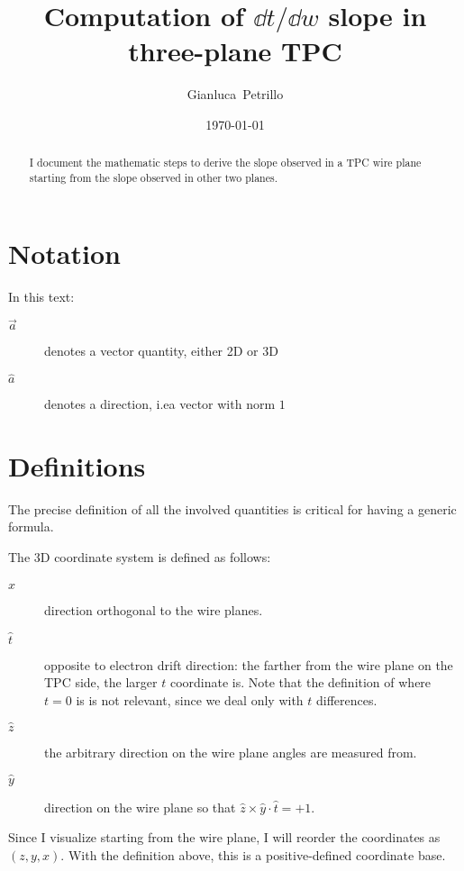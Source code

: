 \documentclass{article}
\title{Computation of $\dd t / \dd w$ slope in three-plane TPC}
\author{Gianluca~Petrillo}
\date{\today}
\DeclareRobustCommand{\brackets}[1]{\ensuremath{\left(#1\right)}}
\newcommand{\ie}{i.e\punct}
\begin{document}
	
	\maketitle
	
	\begin{abstract}
	I document the mathematic steps to derive the slope observed in a TPC wire plane
	starting from the slope observed in other two planes.
	\end{abstract}
	
	\section{Notation}
	\label{sec:Notation}
	
	In this text:
	\begin{description}
		\item[$\vec{a}$] denotes a vector quantity, either 2D or 3D
		\item[$\hat{a}$] denotes a direction, \ie a vector with norm $1$
	\end{description}
	
	\section{Definitions}
	\label{sec:Definitions}
	
	The precise definition of all the involved quantities is critical for having a generic formula.
	
	The 3D coordinate system is defined as follows:
	\begin{description}
		\item[$\hat{x}$] direction orthogonal to the wire planes.
		\item[$\hat{t}$] opposite to electron drift direction:
			the farther from the wire plane on the TPC side, the larger $t$ coordinate is.
			Note that the definition of where $t = 0$ is is not relevant, since we deal only with $t$ differences.
		\item[$\hat{z}$] the arbitrary direction on the wire plane angles are measured from.
		\item[$\hat{y}$] direction on the wire plane so that $\hat{z}\times\hat{y}\cdot\hat{t} = +1$.
	\end{description}
	Since I visualize starting from the wire plane, I will reorder the coordinates as \brackets{z, y, x}.
	With the definition above, this is a positive-defined coordinate base.
	
\end{document}
